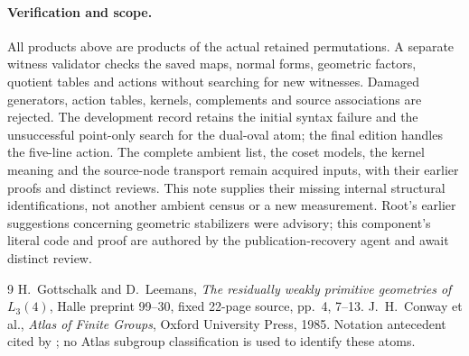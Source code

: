 \documentclass[11pt]{article}
\begin{document}
\paragraph{Verification and scope.}
All products above are products of the actual retained permutations.
A separate witness validator checks the saved maps, normal forms,
geometric factors, quotient tables and actions without searching for
new witnesses. Damaged generators, action tables, kernels, complements
and source associations are rejected. The development record retains
the initial syntax failure and the unsuccessful point-only search for
the dual-oval atom; the final edition handles the five-line action.
The complete ambient list, the coset models, the kernel meaning and
the source-node transport remain acquired inputs, with their earlier
proofs and distinct reviews. This note supplies their missing internal
structural identifications, not another ambient census or a new
measurement. Root's earlier suggestions concerning geometric
stabilizers were advisory; this component's literal code and proof are
authored by the publication-recovery agent and await distinct review.

\begin{thebibliography}{9}
 H.~Gottschalk and D.~Leemans,
\emph{The residually weakly primitive geometries of $L_3(4)$},
Halle preprint 99--30, fixed 22-page source, pp.~4, 7--13.
 J.~H.~Conway et al., \emph{Atlas of Finite Groups},
Oxford University Press, 1985. Notation antecedent cited by \cite{GL};
no Atlas subgroup classification is used to identify these atoms.
\end{thebibliography}
\end{document}
